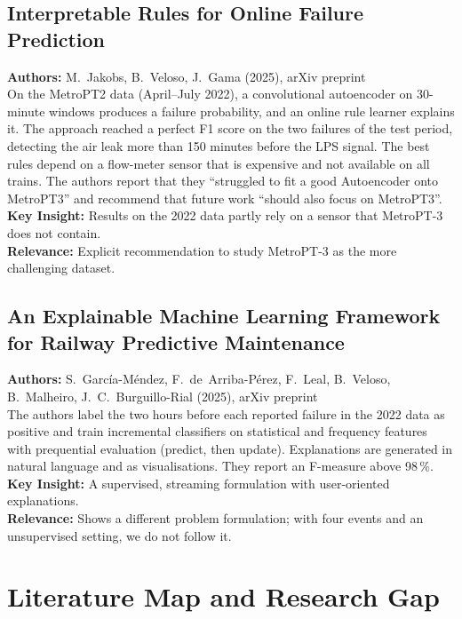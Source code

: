 \subsection[Jakobs et al. (2025): Interpretable Rules for Online Failure Prediction]{Interpretable Rules for Online Failure Prediction}
\textbf{Authors:} M.~Jakobs, B.~Veloso, J.~Gama (2025), arXiv preprint \cite{jakobs2025rules}\\
On the MetroPT2 data (April--July 2022), a convolutional autoencoder on 30-minute windows produces a failure probability, and an online rule learner explains it. The approach reached a perfect F1 score on the two failures of the test period, detecting the air leak more than 150 minutes before the LPS signal. The best rules depend on a flow-meter sensor that is expensive and not available on all trains. The authors report that they ``struggled to fit a good Autoencoder onto MetroPT3'' and recommend that future work ``should also focus on MetroPT3''.\\
\textbf{Key Insight:} Results on the 2022 data partly rely on a sensor that MetroPT-3 does not contain.\\
\textbf{Relevance:} Explicit recommendation to study MetroPT-3 as the more challenging dataset.

\subsection[Garc\'ia-M\'endez et al. (2025): Explainable ML Framework for Railway PdM]{An Explainable Machine Learning Framework for Railway Predictive Maintenance}
\textbf{Authors:} S.~Garc\'ia-M\'endez, F.~de~Arriba-P\'erez, F.~Leal, B.~Veloso, B.~Malheiro, J.~C.~Burguillo-Rial (2025), arXiv preprint \cite{garciamendez2025explainable}\\
The authors label the two hours before each reported failure in the 2022 data as positive and train incremental classifiers on statistical and frequency features with prequential evaluation (predict, then update). Explanations are generated in natural language and as visualisations. They report an F-measure above 98\,\%.\\
\textbf{Key Insight:} A supervised, streaming formulation with user-oriented explanations.\\
\textbf{Relevance:} Shows a different problem formulation; with four events and an unsupervised setting, we do not follow it.

\section{Literature Map and Research Gap}
\label{sec:map}

